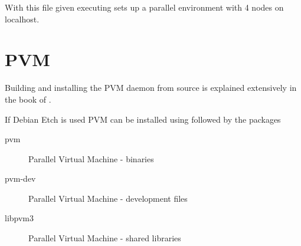 With this file given executing  sets up a
parallel environment with 4 nodes on localhost.

\section{PVM}

Building and installing the PVM daemon from source is explained
extensively in the book of \cite{geist94pvm}.

If Debian Etch is used PVM can be installed using  followed by the packages

\begin{description}
\item[pvm] Parallel Virtual Machine - binaries 
\item[pvm-dev] Parallel Virtual Machine - development files
\item[libpvm3] Parallel Virtual Machine - shared libraries
\end{description}





